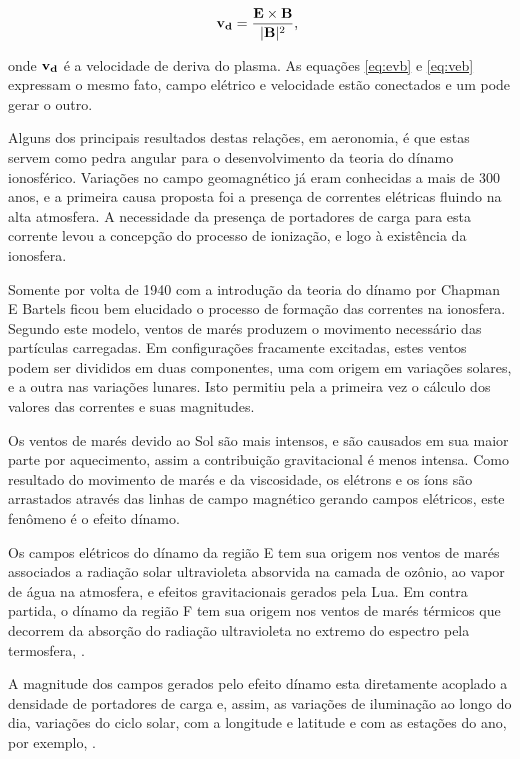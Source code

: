 \begin{equation}\label{eq:veb}
{\bf v_d}=\frac{{\bf E}\times{\bf B}}{|{\bf B}|^2}\mbox{,}~
\end{equation}

onde ${\bf v_d}$ é a velocidade de deriva do plasma. As equações \eqref{eq:evb} e \eqref{eq:veb} expressam o mesmo fato, campo elétrico e velocidade estão conectados e um pode gerar o outro.

Alguns dos principais resultados destas relações, em aeronomia, é que estas servem como pedra angular para o desenvolvimento da teoria do dínamo ionosférico. Variações no campo geomagnético já eram conhecidas a mais de 300 anos, e a primeira causa proposta foi a presença de correntes elétricas fluindo na alta atmosfera. A necessidade da presença de portadores de carga para esta corrente levou a concepção do processo de ionização, e logo à existência da ionosfera.

Somente por volta de 1940 com a introdução da teoria do dínamo por Chapman E Bartels ficou bem elucidado o processo de formação das correntes na ionosfera. Segundo este modelo, ventos de marés produzem o movimento necessário das partículas carregadas. Em configurações fracamente excitadas, estes ventos podem ser divididos em duas componentes, uma com origem em variações solares, e a outra nas variações lunares. Isto permitiu pela a primeira vez o cálculo dos valores das correntes e suas magnitudes.

Os ventos de marés devido ao Sol são mais intensos, e são causados em sua maior parte por aquecimento, assim a contribuição gravitacional é menos intensa. Como resultado do movimento de marés e da viscosidade, os elétrons e os íons são arrastados através das linhas de campo magnético gerando campos elétricos, este fenômeno é o efeito dínamo.

Os campos elétricos do dínamo da região E tem sua origem nos ventos de marés associados a radiação solar ultravioleta absorvida na camada de ozônio, ao vapor de água na atmosfera, e efeitos gravitacionais gerados pela Lua. Em contra partida, o dínamo da região F tem sua origem nos ventos de marés térmicos que decorrem da absorção do radiação ultravioleta no extremo do espectro pela termosfera, \cite{ABDU:2005}.

A magnitude dos campos gerados pelo efeito dínamo esta diretamente acoplado a densidade de portadores de carga e, assim, as variações de iluminação ao longo do dia, variações do ciclo solar, com a longitude e latitude e com as estações do ano, por exemplo, \cite{FEJER:1999}.

